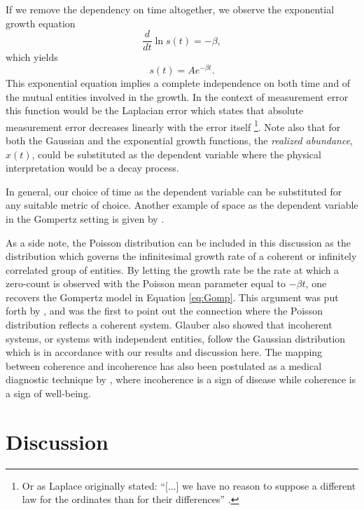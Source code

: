 \documentclass{article}
\begin{document}
If we remove the dependency on time altogether, we observe the exponential growth equation
\begin{equation}
  \frac{d}{dt}\ln s(t) = - \beta,
\end{equation}
which yields 
\begin{equation}
  s(t) = A e^{ - \beta t}.
\end{equation}
This exponential equation implies a complete independence on both time and of the mutual entities involved in the growth. In the context of measurement error this function would be the Laplacian error which states that absolute measurement error decreases linearly with the error itself \footnote{Or as Laplace originally stated: ``[...] we have no reason to suppose a different law for the ordinates than for their differences'' \cite{stahl2006evolution}.}. Note also that for both the Gaussian and the exponential growth functions, the \textit{realized abundance}, $x(t)$, could be substituted as the dependent variable where the physical interpretation would be a decay process. 

In general, our choice of time as the dependent variable can be substituted for any suitable metric of choice. Another example of space as the dependent variable in the Gompertz setting is given by \citet{molski2003coherent}.


As a side note, the Poisson distribution can be included in this discussion as the distribution which governs the infinitesimal growth rate of a coherent or infinitely correlated group of entities. By letting the growth rate be the rate at which a zero-count is observed with the Poisson mean parameter equal to $-\beta t$, one recovers the Gompertz model in Equation \ref{eq:Gomp}. This argument was put forth by \citet{shklovskii2005simple}, and \citet{glauber1963coherent} was the first to point out the connection where the Poisson distribution reflects a coherent system. Glauber also showed that incoherent systems, or systems with independent entities, follow the Gaussian distribution which is in accordance with our results and discussion here. The mapping between coherence and incoherence has also been postulated as a medical diagnostic technique by \citet{zhang1994log}, where incoherence is a sign of disease while coherence is a sign of well-being.

\section{Discussion}
\label{sec:discussion}
\end{document}
